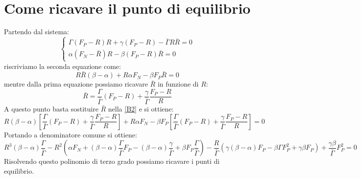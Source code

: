 \section{Come ricavare il punto di equilibrio}
Partendo dal sistema:
\begin{equation}
	\begin{cases}
		\Gamma (F_{P}-R)R+\gamma (F_{P}-R)-\bar{\Gamma}R\bar{R}=0\\
		\alpha (F_{N}-\bar{R})R-\beta (F_{P}-R)\bar{R}=0
	\end{cases}
\end{equation}
riscriviamo la seconda equazione come:
\begin{equation} \label{B2}
	R\bar{R}(\beta - \alpha)+R\alpha F_{N}-\beta F_{P}\bar{R}=0
\end{equation}
mentre dalla prima equazione possiamo ricavare $ \bar{R} $ in funzione di $ R $:
\begin{equation}
	\bar{R}=\frac{\Gamma}{\bar{\Gamma}}(F_{P}-R)+\frac{\gamma}{\bar{\Gamma}}\frac{F_{P}-R}{R}
\end{equation}
A questo punto basta sostituire $\bar{R} $ nella \ref{B2} e si ottiene:
\begin{equation}
	R(\beta - \alpha)\left[\frac{\Gamma}{\bar{\Gamma}}(F_{P}-R)+\frac{\gamma}{\bar{\Gamma}}\frac{F_{P}-R}{R}\right]+R\alpha F_{N}-\beta F_{P}\left[\frac{\Gamma}{\bar{\Gamma}}(F_{P}-R)+\frac{\gamma}{\bar{\Gamma}}\frac{F_{P}-R}{R}\right]=0
\end{equation} 
Portando a denominatore comune si ottiene:
\begin{equation}
	R^{3}(\beta - \alpha)\frac{\Gamma}{\bar{\Gamma}}-R^{2}\left(\alpha F_{N}+(\beta - \alpha)\frac{\Gamma}{\bar{\Gamma}}F_{P}-(\beta - \alpha)\frac{\gamma}{\bar{\Gamma}}+\beta F_{P}\frac{\Gamma}{\bar{\Gamma}}\right)-\frac{R}{\bar{\Gamma}}\left(\gamma (\beta - \alpha)F_{P}-\beta \Gamma F^{2}_{P}+\gamma\beta F_{P}\right)+\frac{\gamma\beta}{\bar{\Gamma}}F^{2}_{P}=0
\end{equation}
Risolvendo questo polinomio di terzo grado possiamo ricavare i punti di equilibrio.